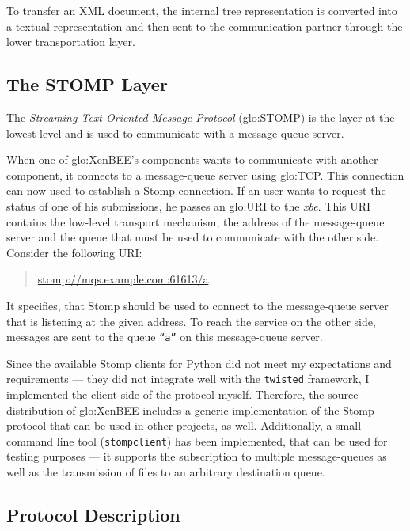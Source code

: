 To transfer an XML document, the internal tree representation is converted
into a textual  representation and then sent to  the communication partner
through the lower transportation layer.

\subsection{The STOMP Layer}
\label{sec:protocol:stomp}

The  \emph{Streaming  Text  Oriented Message  Protocol}  (\gls{glo:STOMP})
\cite{stomp} is the  layer at the lowest level and  is used to communicate
with  a  message-queue  server.

When  one  of  \gls{glo:XenBEE}'s  components wants  to  communicate  with
another   component,  it   connects  to   a  message-queue   server  using
\gls{glo:TCP}.    This   connection   can   now  used   to   establish   a
Stomp-connection. If  an user wants  to request the  status of one  of his
submissions,  he  passes an  \gls{glo:URI}  to  the  \emph{xbe}. This  URI
contains   the  low-level   transport  mechanism,   the  address   of  the
message-queue server and  the queue that must be  used to communicate with
the other side.  Consider the following URI:
\begin{quote}
  \url{stomp://mqs.example.com:61613/a}
\end{quote}
It specifies,  that Stomp should be  used to connect  to the message-queue
server that is listening at the given address. To reach the service on the
other  side,  messages  are  sent  to the  queue  \texttt{``a''}  on  this
message-queue server.

Since the available Stomp clients  for Python did not meet my expectations
and requirements --- they did not integrate well with the \texttt{twisted}
framework,  I  implemented  the   client  side  of  the  protocol  myself.
Therefore, the source distribution  of \gls{glo:XenBEE} includes a generic
implementation of the  Stomp protocol that can be  used in other projects,
as well.  Additionally, a  small command line  tool (\texttt{stompclient})
has  been  implemented, that  can  be used  for  testing  purposes ---  it
supports  the  subscription to  multiple  message-queues  as  well as  the
transmission of files to an arbitrary destination queue.

\subsection*{Protocol Description}

